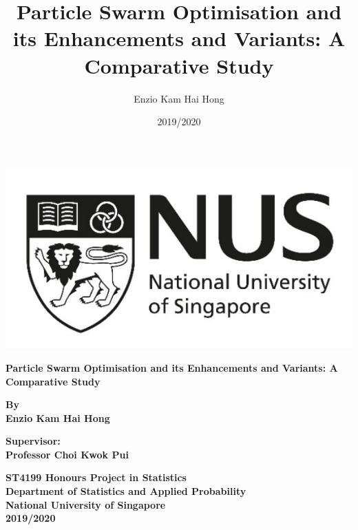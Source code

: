\documentclass[12pt]{article}
\title{Particle Swarm Optimisation and its Enhancements and Variants: A Comparative Study}
\author{Enzio Kam Hai Hong}
\date{2019/2020}
\theoremstyle{definition}
\begin{document}
\begin{center}
    \singlespacing
	\vspace*{-0.5cm}

    \includegraphics[scale=0.5]{images/nus_logo.png}
    
    \vspace{3cm}
    
	\textbf{\large Particle Swarm Optimisation and its Enhancements and Variants: A Comparative Study}
	
	\vspace{3cm}
	
    \textbf{\large By \\ \vspace{0.5cm} \large Enzio Kam Hai Hong}
    
    \vspace{3cm}
    
    \textbf{\large Supervisor: \\ \vspace{0.5cm} Professor Choi Kwok Pui}
    
    \vspace{3cm}
    
    \textbf{\large 
        ST4199 Honours Project in Statistics \\
        Department of Statistics and Applied Probability \\
        National University of Singapore \\
        2019/2020
    }
    
\end{center}

\end{document}
